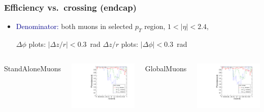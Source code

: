 \documentclass[compress]{beamer}
\begin{document}
\begin{frame}
\frametitle{Efficiency vs.\ crossing (endcap)}
\begin{itemize}
\item \textcolor{darkblue}{Denominator:} both muons in selected $p_T$ region, $1 < |\eta| < 2.4$,

$\Delta \phi$ plots: $|\Delta z/r| < 0.3$~rad \hfill $\Delta z/r$ plots: $|\Delta \phi| < 0.3$~rad
\end{itemize}

\vfill
\begin{columns}
\centering StandAloneMuons

\includegraphics[width=\linewidth]{barrel_dphi_bypt_StandAloneMuon.pdf}

\centering GlobalMuons

\includegraphics[width=\linewidth]{barrel_dphi_bypt_GlobalMuon.pdf}


\end{columns}
\end{frame}
\end{document}
